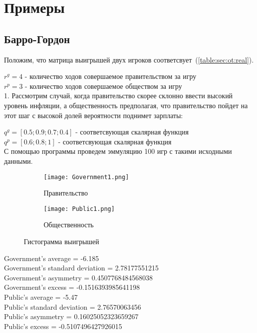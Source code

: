 \section{Примеры} 
\subsection{Барро-Гордон}
Положим, что матрица выигрышей двух игроков соответсвует~(\ref{table:sec:ot:real}).

$r^g= 4 $ - количество ходов совершаемое  правительством за игру\\
$r^p= 3 $ - количество ходов совершаемое  обществом за игру\\

1.
Рассмотрим случай, когда правительство скорее склонно ввести высокий уровень инфляции, а общественность предполагая, что правительство пойдет на этот шаг с высокой долей вероятности поднимет зарплаты:

$q^g =[ 0.5; 0.9; 0.7; 0.4 ]$ - соответсвующая скалярная функция \\
$q^p=[ 0.6; 0.8; 1] $ - соответсвующая скалярная функция \\

С помощью программы проведем эммуляцию 100 игр с такими исходными данными.

\begin{figure}[h]
	
	\begin{subfigure}{0.5\textwidth}
		\texttt{[image: Government1.png]} 
		\caption{Правительство}
		\label{fig:government1}
	\end{subfigure}
	\begin{subfigure}{0.5\textwidth}
		\texttt{[image: Public1.png]}
		\caption{Общественность}
		\label{fig:public2}
	\end{subfigure}
	
	\caption{Гистограмма выигрышей}
	\label{fig:stat1}
\end{figure}
Government's average = -6.185\\
Government's standard deviation = 2.78177551215\\
Government's asymmetry = 0.4507768484568038\\
Government's excess = -0.1516393985641198\\
Public's average = -5.47\\
Public's standard deviation = 2.76570063456\\
Public's asymmetry = 0.16025052323659267\\
Public's excess = -0.5107496427926015\\

